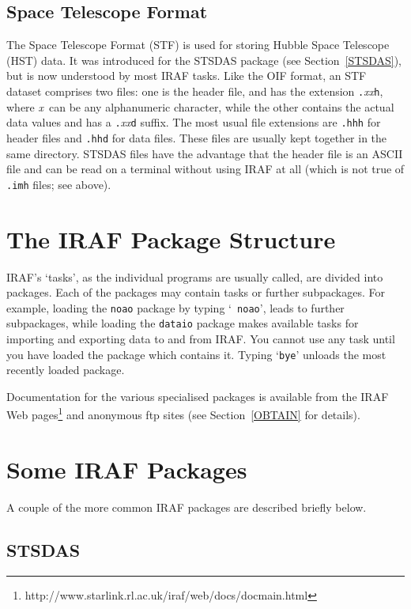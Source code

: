 \documentclass[twoside,11pt]{article}
\newcommand{\htmladdnormallinkfoot}[2]{#1\footnote{#2}}
\newcommand{\xlabel}[1]{}
\begin{document}
\subsection{Space Telescope Format}

The Space Telescope Format (STF) is used for storing Hubble Space
Telescope (HST) data.  It was introduced for the STSDAS package
(see Section~\ref{STSDAS}), but is now understood by most IRAF
tasks.  Like the OIF format, an STF dataset comprises two files:
one is the header file, and has the extension
{\tt .}{\it xx}\/{\tt h}, where {\it x}\, can be any
alphanumeric character, while the other contains the actual data
values and has a {\tt .}{\it xx}\/{\tt d} suffix.  The most usual file
extensions are {\tt .hhh} for header files and {\tt .hhd} for data files.
These files are usually kept together in the same directory.  STSDAS files
have the advantage that the header file is an ASCII file and can be read on
a terminal without using IRAF at all (which is not true of {\tt .imh} files;
see above).


\section{\xlabel{STRUCTURE}\label{STRUCTURE}The IRAF Package Structure}

IRAF's `tasks', as the individual programs are usually called, are
divided into packages.  Each of the packages may contain tasks or further
subpackages. For example, loading the {\tt noao} package by typing `{\tt
noao}', leads to further subpackages, while loading the {\tt dataio}
package makes available tasks for importing and exporting data to and
from IRAF. You cannot use any task until you have loaded the package
which contains it. Typing `{\tt bye}' unloads the most recently loaded
package.

Documentation for the various specialised packages is available from
the IRAF \htmladdnormallinkfoot{Web pages}
{http://www.starlink.rl.ac.uk/iraf/web/docs/docmain.html}
and anonymous ftp sites (see Section~\ref{OBTAIN} for details).


\section{\xlabel{PACKAGES}\label{PACKAGES}Some IRAF Packages}

A couple of the more common IRAF packages are described briefly
below.

\subsection{\label{STSDAS}STSDAS}
\end{document}
